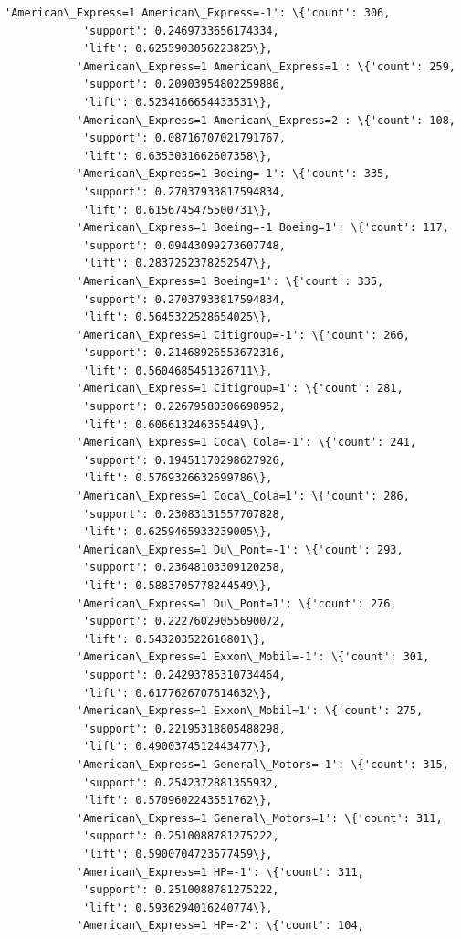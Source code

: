 \documentclass[11pt]{article}
\begin{document}
\begin{Verbatim}[commandchars=\\\{\}]
           'American\_Express=1 American\_Express=-1': \{'count': 306,
            'support': 0.2469733656174334,
            'lift': 0.6255903056223825\},
           'American\_Express=1 American\_Express=1': \{'count': 259,
            'support': 0.20903954802259886,
            'lift': 0.5234166654433531\},
           'American\_Express=1 American\_Express=2': \{'count': 108,
            'support': 0.08716707021791767,
            'lift': 0.6353031662607358\},
           'American\_Express=1 Boeing=-1': \{'count': 335,
            'support': 0.27037933817594834,
            'lift': 0.6156745475500731\},
           'American\_Express=1 Boeing=-1 Boeing=1': \{'count': 117,
            'support': 0.09443099273607748,
            'lift': 0.2837252378252547\},
           'American\_Express=1 Boeing=1': \{'count': 335,
            'support': 0.27037933817594834,
            'lift': 0.5645322528654025\},
           'American\_Express=1 Citigroup=-1': \{'count': 266,
            'support': 0.21468926553672316,
            'lift': 0.5604685451326711\},
           'American\_Express=1 Citigroup=1': \{'count': 281,
            'support': 0.22679580306698952,
            'lift': 0.606613246355449\},
           'American\_Express=1 Coca\_Cola=-1': \{'count': 241,
            'support': 0.19451170298627926,
            'lift': 0.5769326632699786\},
           'American\_Express=1 Coca\_Cola=1': \{'count': 286,
            'support': 0.23083131557707828,
            'lift': 0.6259465933239005\},
           'American\_Express=1 Du\_Pont=-1': \{'count': 293,
            'support': 0.23648103309120258,
            'lift': 0.5883705778244549\},
           'American\_Express=1 Du\_Pont=1': \{'count': 276,
            'support': 0.22276029055690072,
            'lift': 0.543203522616801\},
           'American\_Express=1 Exxon\_Mobil=-1': \{'count': 301,
            'support': 0.24293785310734464,
            'lift': 0.6177626707614632\},
           'American\_Express=1 Exxon\_Mobil=1': \{'count': 275,
            'support': 0.22195318805488298,
            'lift': 0.4900374512443477\},
           'American\_Express=1 General\_Motors=-1': \{'count': 315,
            'support': 0.2542372881355932,
            'lift': 0.5709602243551762\},
           'American\_Express=1 General\_Motors=1': \{'count': 311,
            'support': 0.2510088781275222,
            'lift': 0.5900704723577459\},
           'American\_Express=1 HP=-1': \{'count': 311,
            'support': 0.2510088781275222,
            'lift': 0.5936294016240774\},
           'American\_Express=1 HP=-2': \{'count': 104,

\end{Verbatim}
\end{document}
